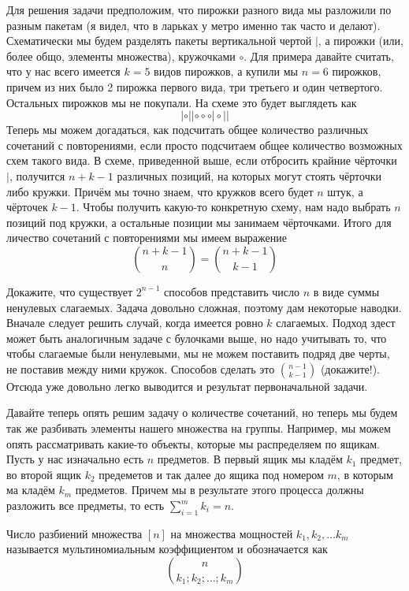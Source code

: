 Для решения задачи предположим, что пирожки разного вида мы разложили по разным пакетам (я видел, что в ларьках у метро именно так часто и делают). Схематически мы будем разделять пакеты вертикальной чертой $|$, а пирожки (или, более общо, элементы множества), кружочками $\circ$. Для примера давайте считать, что у нас всего имеется $k=5$ видов пирожков, а купили мы $n=6$ пирожков, причем из них было 2 пирожка первого вида, три третьего и один четвертого. Остальных пирожков мы не покупали. На схеме это будет выглядеть как
$$|\circ||\circ\circ\circ|\circ||$$
Теперь мы можем догадаться, как подсчитать общее количество различных сочетаний с повторениями, если просто подсчитаем общее количество возможных схем такого вида. В схеме, приведенной выше, если отбросить крайние чёрточки $|$, получится $n+k-1$ различных позиций, на которых могут стоять чёрточки либо кружки. Причём мы точно знаем, что кружков всего будет $n$ штук, а чёрточек $k-1$. Чтобы получить какую-то конкретную схему, нам надо выбрать $n$ позиций под кружки, а остальные позиции мы занимаем чёрточками. Итого для личество сочетаний с повторениями мы имеем выражение
$${n+k-1 \choose n} = {n+k-1\choose k - 1}$$

\begin{exercise}
Докажите, что существует $2^{n-1}$ способов представить число $n$ в виде суммы ненулевых слагаемых. Задача довольно сложная, поэтому дам некоторые наводки. Вначале следует решить случай, когда имеется ровно $k$ слагаемых. Подход здест может быть аналогичным задаче с булочками выше, но надо учитывать то, что чтобы слагаемые были ненулевыми, мы не можем поставить подряд две черты, не поставив между ними кружок. Способов сделать это $n-1\choose k -1$ (докажите!). Отсюда уже довольно легко выводится и результат первоначальной задачи.
\end{exercise}

Давайте теперь опять решим задачу о количестве сочетаний, но теперь мы будем так же разбивать элементы нашего множества на группы. Например, мы можем опять рассматривать какие-то объекты, которые мы распределяем по ящикам. Пусть у нас изначально есть $n$ предметов. В первый ящик мы кладём $k_1$ предмет, во второй ящик $k_2$ предеметов и так далее до ящика под номером $m$, в которым ма кладём $k_m$ предметов. Причем мы в результате этого процесса должны разложить все предметы, то есть $\sum_{i=1}^m k_i = n$.

\begin{definition}
Число разбиений множества $[n]$ на множества мощностей $k_1, k_2, \ldots k_m$ называется мультиномиальным коэффициентом и обозначается как
$$n \choose k_1; k_2;\ldots; k_m$$
\end{definition}

